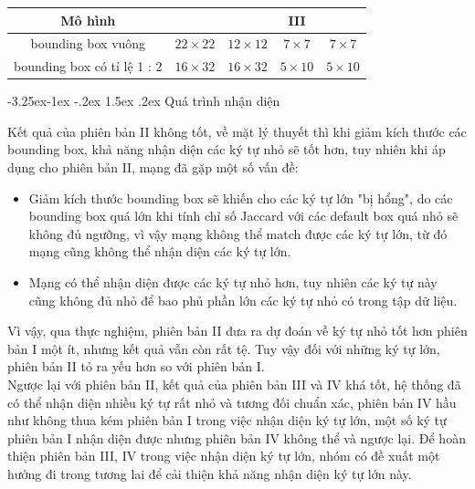 \documentclass[a4paper,12pt]{article}
\makeatletter
\newcounter {subsubsubsection}[subsubsection]
\newcommand\subsubsubsection{\@startsection{subsubsubsection}{4}{\z@}%
	{-3.25ex\@plus -1ex \@minus -.2ex}%
	{1.5ex \@plus .2ex}%
	{\normalfont\normalsize\bfseries}}
\makeatother
\begin{document}
	\begin{center}
		\begin{tabular}{||c | c | c | c | c||} 
			\hline
			Mô hình & \makecell{  I } & \makecell{ II} & III &  \makecell{ IV}  \\ [0.5ex] 
			\hline
			bounding box vuông & $22 \times 22$ & $12 \times 12$ & $7 \times 7$ & $7 \times 7$ \\
			\hline
			bounding box có tỉ lệ 1 : 2 & $16 \times 32$ & $16 \times 32$ & $5 \times 10$ & $5 \times 10$ \\
			\hline
		\end{tabular}
	\end{center}
	
	\subsubsubsection{Quá trình nhận diện}
	
	Kết quả của phiên bản II không tốt, về mặt lý thuyết thì khi giảm kích thước các bounding box, khả năng nhận diện các ký tự nhỏ sẽ tốt hơn, tuy nhiên khi áp dụng cho phiên bản II, mạng đã gặp một số vấn đề: 
	
	\begin{itemize}
		\item Giảm kích thước bounding box sẽ khiến cho các ký tự lớn "bị hổng", do các bounding box quá lớn khi tính chỉ số Jaccard\cite{Jaccard} với các default box quá nhỏ sẽ không đủ ngưỡng, vì vậy mạng không thể match được các ký tự lớn, từ đó mạng cũng không thể nhận diện các ký tự lớn.
		\item Mạng có thể nhận diện được các ký tự nhỏ hơn, tuy nhiên các ký tự này cũng không đủ nhỏ để bao phủ phần lớn các ký tự nhỏ có trong tập dữ liệu.
	\end{itemize}
	Vì vậy, qua thực nghiệm, phiên bản II đưa ra dự đoán về ký tự nhỏ tốt hơn phiên bản I một ít, nhưng kết quả vẫn còn rất tệ. Tuy vậy đối với những ký tự lớn, phiên bản II tỏ ra yếu hơn so với phiên bản I.\\
	Ngược lại với phiên bản II, kết quả của phiên bản III và IV khá tốt, hệ thống đã có thể nhận diện nhiều ký tự rất nhỏ và tương đối chuẩn xác, phiên bản IV hầu như không thua kém phiên bản I trong việc nhận diện ký tự lớn, một số ký tự phiên bản I nhận diện được nhưng phiên bản IV không thể và ngược lại. Để hoàn thiện phiên bản III, IV trong việc nhận diện ký tự lớn, nhóm có đề xuất một hướng đi trong tương lai để cải thiện khả năng nhận diện ký tự lớn này.\\
	
\end{document}

